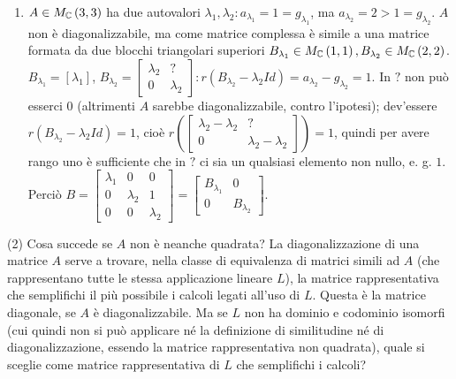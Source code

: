 \documentclass{article}
\begin{document}
\begin{enumerate}
\item $A\in M_{%
\mathbb{C}
}\left( 3,3\right) $ ha due autovalori $\lambda _{1},\lambda _{2}:a_{\lambda
_{1}}=1=g_{\lambda _{1}}$, ma $a_{\lambda _{2}}=2>1=g_{\lambda _{2}}$. $A$
non \`{e} diagonalizzabile, ma come matrice complessa \`{e} simile a una
matrice formata da due blocchi triangolari superiori $B_{\lambda _{1}}\in M_{%
\mathbb{C}
}\left( 1,1\right) ,B_{\lambda _{2}}\in M_{%
\mathbb{C}
}\left( 2,2\right) $. $B_{\lambda _{1}}=\left[ \lambda _{1}\right] $, $%
B_{\lambda _{2}}=\left[ 
\begin{array}{cc}
\lambda _{2} & ? \\ 
0 & \lambda _{2}%
\end{array}%
\right] :r\left( B_{\lambda _{2}}-\lambda _{2}Id\right) =a_{\lambda
_{2}}-g_{\lambda _{2}}=1$. In $?$ non pu\`{o} esserci $0$ (altrimenti $A$
sarebbe diagonalizzabile, contro l'ipotesi); dev'essere $r\left( B_{\lambda
_{2}}-\lambda _{2}Id\right) =1$, cio\`{e} $r\left( \left[ 
\begin{array}{cc}
\lambda _{2}-\lambda _{2} & ? \\ 
0 & \lambda _{2}-\lambda _{2}%
\end{array}%
\right] \right) =1$, quindi per avere rango uno \`{e} sufficiente che in $?$
ci sia un qualsiasi elemento non nullo, e. g. $1$. Perci\`{o} $B=\left[ 
\begin{array}{ccc}
\lambda _{1} & 0 & 0 \\ 
0 & \lambda _{2} & 1 \\ 
0 & 0 & \lambda _{2}%
\end{array}%
\right] =\left[ 
\begin{array}{cc}
B_{\lambda _{1}} & 0 \\ 
0 & B_{\lambda _{2}}%
\end{array}%
\right] $.
\end{enumerate}

(2) Cosa succede se $A$ non \`{e} neanche quadrata? La diagonalizzazione di
una matrice $A$ serve a trovare, nella classe di equivalenza di matrici
simili ad $A$ (che rappresentano tutte le stessa applicazione lineare $L$),
la matrice rappresentativa che semplifichi il pi\`{u} possibile i calcoli
legati all'uso di $L$. Questa \`{e} la matrice diagonale, se $A$ \`{e}
diagonalizzabile. Ma se $L$ non ha dominio e codominio isomorfi (cui quindi
non si pu\`{o} applicare n\'{e} la definizione di similitudine n\'{e} di
diagonalizzazione, essendo la matrice rappresentativa non quadrata), quale
si sceglie come matrice rappresentativa di $L$ che semplifichi i calcoli?
\end{document}
